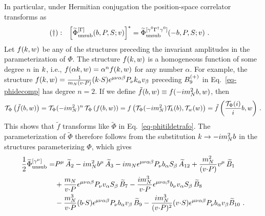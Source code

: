 \begin{widetext}
In particular, under Hermitian conjugation the position-space correlator transforms as
\begin{align}
	&(\dagger): &\left[ \widetilde{\Phi}^{[\Gamma]}_{\text{unsub}}(b,P,S;v)  \right]^* &= \widetilde{\Phi}^{[\gamma^0 \Gamma^\dagger \gamma^0]}_{\text{unsub}}(-b,P,S;v)  \ .\label{eq-conhermtilde}
\end{align}
Let $f(k,w)$ be any of the structures preceding the invariant amplitudes in the parameterization of $\Phi$.
The structure $f(k,w)$ is a homogeneous function of some degree $n$ in $k$, i.e., $f(\alpha k,w) = \alpha^n f(k,w)$ for any number $\alpha$. 
For example, the structure $f(k,w) = \frac{1}{m_N (v {\cdot} P)} (k {\cdot} S) \epsilon^{\mu \nu \alpha \beta} P_\nu k_\alpha v_\beta$ preceding $B^{(+)}_9$ in Eq.\ \eqref{eq-phidecomp} has degree $n=2$.
If we define $\tilde f(b,w) \equiv f(- i m_N^2 b,w)$, then 
\begin{align}
	\mathcal{T}_\Phi\left( \tilde f(b, w) \right) =
	\mathcal{T}_\Phi(-i m_N^2)^n\, \mathcal{T}_\Phi\left( f( b, w) \right) =
	f\left( \mathcal{T}_\Phi(-i m_N^2) \mathcal{T}_k(b) , \mathcal{T}_w(w) \right) =
	\tilde f \left(  \frac{\mathcal{T}_\Phi(i)}{i} b, w \right)\, .
	\end{align}
This shows that $\tilde f$ transforms like $\widetilde \Phi$ in Eq.\ \eqref{eq-phitildetrafo}.
The parameterization of $\widetilde{\Phi}$ therefore follows from the substitution $k \rightarrow -i m_N^2 b$ in the structures parameterizing $\Phi$, which gives
\begin{align}  \frac{1}{2}\widetilde \Phi^{[\gamma^\mu]}_{\text{unsub}}  = & P^\mu\, \widetilde{A}_2 - i m_N^2 b^\mu\, \widetilde{A}_3 - i m_N \epsilon^{\mu \nu \alpha \beta} P_\nu b_\alpha S_\beta\, \widetilde{A}_{12} + \frac{m_N^2}{(v {\cdot} P)} v^\mu\, \widetilde{B}_1\nonumber\\
& + \frac{m_N}{v {\cdot} P} \epsilon^{\mu \nu \alpha \beta} P_\nu v_\alpha S_\beta\, \widetilde{B}_7  - \frac{ i m_N^3}{v {\cdot} P} \epsilon^{\mu \nu \alpha \beta} b_\nu v_\alpha S_\beta\, \widetilde{B}_8 \nonumber\\
& - \frac{m_N^3}{v {\cdot} P} (b {\cdot} S) \epsilon^{\mu \nu \alpha \beta} P_\nu b_\alpha v_\beta\, \widetilde{B}_9  - \frac{i m_N^3}{(v {\cdot} P)^2} (v {\cdot} S) \epsilon^{\mu \nu \alpha \beta} P_\nu b_\alpha v_\beta \widetilde{B}_{10}\ . 
\label{eq-phitildedecomp}
\end{align}


\end{widetext}
